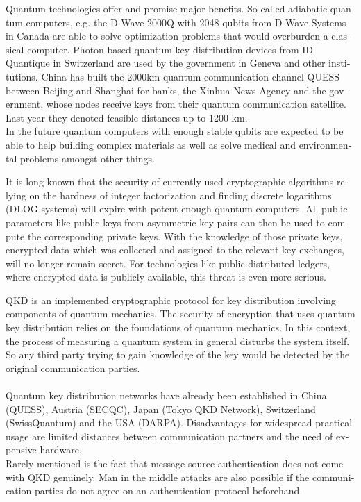 \documentclass[a4paper,11pt]{article}
\begin{document}
\begin{otherlanguage}{english}
\begin{multicols}{2}
Quantum technologies offer and promise major benefits. So called adiabatic quantum computers, e.g. the D-Wave 2000Q with 2048 qubits from D-Wave Systems in Canada are able to solve optimization problems that would overburden a classical computer. Photon based quantum key distribution devices from ID Quantique in Switzerland are used by the government in Geneva and other institutions. China has built the 2000km quantum communication channel QUESS between Beijing and Shanghai for banks, the Xinhua News Agency and the government, whose nodes receive keys from their quantum communication satellite. Last year they denoted feasible distances up to 1200 km. \\
In the future quantum computers with enough stable qubits are expected to be able to help building complex materials as well as solve medical and environmental problems amongst other things.

It is long known that the security of currently used cryptographic algorithms relying on the hardness of integer factorization and finding discrete logarithms (DLOG systems) \cite{SHO} will expire with potent enough quantum computers. All public parameters like public keys from asymmetric key pairs can then be used to compute the corresponding private keys. With the knowledge of those private keys, encrypted data which was collected and assigned to the relevant key exchanges, will no longer remain secret. For technologies like public distributed ledgers, where encrypted data is publicly available, this threat is even more serious. \\


QKD is an implemented cryptographic protocol for key distribution involving components of quantum mechanics. The security of encryption that uses quantum key distribution relies on the foundations of quantum mechanics. In this context, the process of measuring a quantum system in general disturbs the system itself. So any third party trying to gain knowledge of the key would be detected by the original communication parties. \\ 
\\
Quantum key distribution networks have already been established in China (QUESS), Austria (SECQC), Japan (Tokyo QKD Network), Switzerland (SwissQuantum) and the USA (DARPA). 
Disadvantages for widespread practical usage are limited distances between communication partners and the need of expensive hardware. \\
Rarely mentioned is the fact that message source authentication does not come with QKD genuinely. Man in the middle attacks are also possible if the communication parties do not agree on an authentication protocol beforehand.  


\end{multicols}
\end{otherlanguage}
\end{document}
